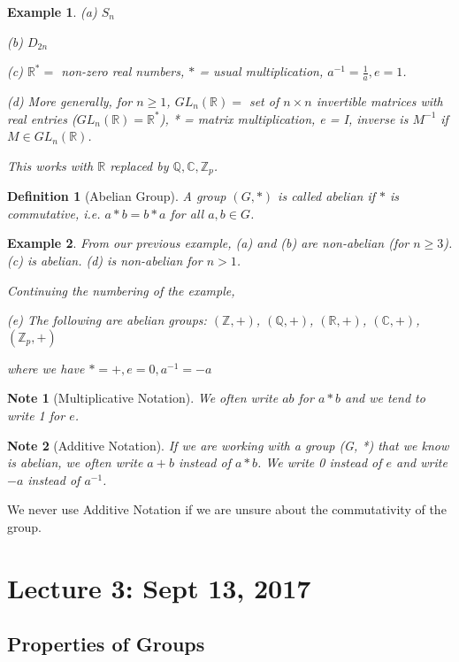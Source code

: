 \documentclass[11pt, oneside]{book}
\theoremstyle{break}
\newtheorem*{note}{Note}
\newtheorem{defn}{Definition}[section]
\newtheorem{eg}{Example}[section]
\newcommand{\bb}[1]{\mathbb{#1}}			%
\begin{document}
\begin{eg}
    (a) $S_n$

    (b) $D_{2n}$

    (c) $\bb{R}^* = $ non-zero real numbers, $*$ = usual multiplication, $a^{-1} = \frac{1}{a}, e = 1$.

    (d) More generally, for $n \geq 1$, $GL_n (\bb{R}) =$ set of $n \times n$ invertible matrices with real entries ($GL_n (\bb{R}) = \bb{R}^*$), * = matrix multiplication, e = I, inverse is $M^{-1}$ if $M \in GL_n (\bb{R})$.

    This works with $\bb{R}$ replaced by $\bb{Q}, \bb{C}, \bb{Z}_p$.
\end{eg}

\begin{defn}[Abelian Group]
    A group $(G, *)$ is called abelian if $*$ is commutative, i.e. $a * b = b * a$ for all $a, b \in G$.
\end{defn}

\begin{eg}
   From our previous example, (a) and (b) are non-abelian (for $n \geq 3$). (c) is abelian. (d) is non-abelian for $n > 1$.

    Continuing the numbering of the example,

    (e) The following are abelian groups: $(\bb{Z}, +)$, $(\bb{Q}, +)$, $(\bb{R}, +)$, $(\bb{C}, +)$, $(\bb{Z}_p, +)$

    where we have $* = +, e = 0, a^{-1} = -a$
\end{eg}

\begin{note}[Multiplicative Notation]
    We often write $ab$ for $a*b$ and we tend to write 1 for $e$.
\end{note}

\begin{note}[Additive Notation]
    If we are working with a group (G, *) that we know is abelian, we often write $a + b$ instead of $a * b$. We write 0 instead of $e$ and write $-a$ instead of $a^{-1}$.
\end{note}

We never use Additive Notation if we are unsure about the commutativity of the group.

\chapter{Lecture 3: Sept 13, 2017}\label{lec3}

\section{Properties of Groups}
\end{document}
